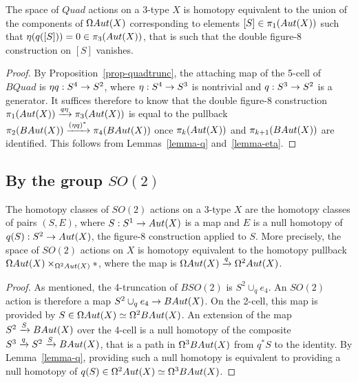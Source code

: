 \documentclass{amsart}
\begin{document}
\begin{proposition} \label{prop-quadaction}
The space of $Quad$ actions on a 3-type $X$ is homotopy equivalent to the union of the components of $\Omega Aut(X)$ corresponding to elements $[S] \in \pi_1(Aut(X))$ such that $\eta(q([S])) = 0 \in \pi_3(Aut(X))$, that is such that the double figure-8 construction on $[S]$ vanishes.
\end{proposition}
\begin{proof}
By Proposition~\ref{prop-quadtrunc}, the attaching map of the 5-cell of $BQuad$ is $\eta q: S^4 \rightarrow S^2$, where $\eta : S^4 \rightarrow S^3$ is nontrivial and $q: S^3 \rightarrow S^2$ is a generator.  It suffices therefore to know that the double figure-8 construction $\pi_1(Aut(X)) \xrightarrow{q \eta} \pi_3(Aut(X))$ is equal to the pullback $\pi_2(BAut(X)) \xrightarrow{(\eta q)^\ast} \pi_4(BAut(X))$ once $\pi_{k}(Aut(X))$ and $\pi_{k+1}(BAut(X))$ are identified.  This follows from Lemmas~\ref{lemma-q} and~\ref{lemma-eta}.
\end{proof}



\subsection{By the group $SO(2)$}

\begin{prop} \label{prop-so2action}
The homotopy classes of $SO(2)$ actions on a 3-type $X$ are the homotopy classes of pairs $(S,E)$, where $S: S^1 \rightarrow Aut(X)$ is a map and $E$ is a null homotopy of $q(S): S^2 \rightarrow Aut(X)$, the figure-8 construction applied to $S$.  More precisely, the space of $SO(2)$ actions on $X$ is homotopy equivalent to the homotopy pullback $\Omega Aut(X) \times_{\Omega^2 Aut(X)} \ast$, where the map is $\Omega Aut(X) \xrightarrow{q} \Omega^2 Aut(X)$.
\end{prop}
\begin{proof}
As mentioned, the 4-truncation of $BSO(2)$ is $S^2 \cup_q e_4$.  An $SO(2)$ action is therefore a map $S^2 \cup_q e_4 \rightarrow BAut(X)$.  On the 2-cell, this map is provided by $S \in \Omega Aut(X) \simeq \Omega^2 BAut(X)$.  An extension of the map $S^2 \xrightarrow{S} BAut(X)$ over the 4-cell is a null homotopy of the composite $S^3 \xrightarrow{q} S^2 \xrightarrow{S} BAut(X)$, that is a path in $\Omega^3 BAut(X)$ from $q^\ast S$ to the identity.  By Lemma~\ref{lemma-q}, providing such a null homotopy is equivalent to providing a null homotopy of $q(S) \in \Omega^2Aut(X) \simeq \Omega^3 BAut(X)$.
\end{proof}
\end{document}

